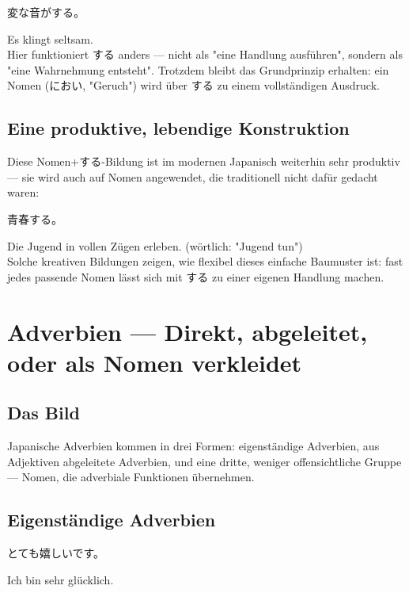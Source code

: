 \documentclass[12pt]{book}
\begin{document}
\par\quad 変な音がする。\\
\par\quad Es klingt seltsam.\\

Hier funktioniert する anders — nicht als "eine Handlung ausführen", sondern als "eine Wahrnehmung entsteht". Trotzdem bleibt das Grundprinzip erhalten: ein Nomen (におい, "Geruch") wird über する zu einem vollständigen Ausdruck.

\section*{Eine produktive, lebendige Konstruktion}

Diese Nomen+する-Bildung ist im modernen Japanisch weiterhin sehr produktiv — sie wird auch auf Nomen angewendet, die traditionell nicht dafür gedacht waren:

\par\quad 青春する。\\
\par\quad Die Jugend in vollen Zügen erleben. (wörtlich: "Jugend tun")\\

Solche kreativen Bildungen zeigen, wie flexibel dieses einfache Baumuster ist: fast jedes passende Nomen lässt sich mit する zu einer eigenen Handlung machen.


\chapter{Adverbien — Direkt, abgeleitet, oder als Nomen verkleidet}

\section*{Das Bild}

Japanische Adverbien kommen in drei Formen: eigenständige Adverbien, aus Adjektiven abgeleitete Adverbien, und eine dritte, weniger offensichtliche Gruppe — Nomen, die adverbiale Funktionen übernehmen.

\section*{Eigenständige Adverbien}

\par\quad とても嬉しいです。\\
\par\quad Ich bin sehr glücklich.\\
\end{document}
